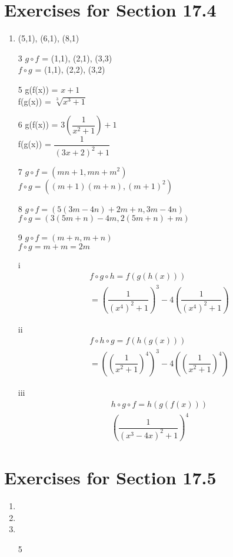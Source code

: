 \documentclass[12pt]{article}
\begin{document}
\section*{Exercises for Section 17.4}
\begin{enumerate}
    \item {(5,1), (6,1), (8,1)}
    \item [3] $g\circ f$ = {(1,1), (2,1), (3,3)}\\
    $f\circ g$ = {(1,1), (2,2), (3,2)}\\
	\item [5] g(f(x)) = $x+1$\\
	    f(g(x)) = $\sqrt[3]{x^3 + 1}$
	\item [6] g(f(x)) = $3(\dfrac{1}{x^2 + 1})+1$\\
	    f(g(x)) = $\dfrac{1}{(3x+2)^2 + 1}$
	\item [7] $g\circ f = (mn + 1,mn + m^2)$\\
    $f\circ g = ((m+1)(m+n), (m+1)^2)$\\
	\item [8] $g\circ f = (5(3m-4n)+2m+n,3m-4n)$\\
    $f\circ g = (3(5m+n)-4m,2(5m+n)+m)$\\
	\item [9] $g\circ f = (m+n,m+n)$\\
    $f\circ g = m+m = 2m$\\
\end{enumerate}
\begin{enumerate}
    \item [i]
	\begin{equation*}
		\begin{split}
			f\circ g \circ h = f(g(h(x)))\\
			= (\dfrac{1}{(x^4)^2 + 1})^3 -4(\dfrac{1}{(x^4)^2 + 1})
		\end{split}
	\end{equation*}
    \item [ii]
	\begin{equation*}
		\begin{split}
			f\circ h \circ g = f(h(g(x)))\\
			= ((\dfrac{1}{x^2 + 1})^4)^3 -4((\dfrac{1}{x^2 + 1})^4)
		\end{split}
	\end{equation*}
    \item [iii]
	\begin{equation*}
		\begin{split}
			h\circ g \circ f = h(g(f(x)))\\
			(\dfrac{1}{(x^3 -4x)^2 + 1})^4
		\end{split}
	\end{equation*}
\end{enumerate}
\section*{Exercises for Section 17.5}
\begin{enumerate}
	\item 
	\item 
	\item 
	\item [5]
\end{enumerate}
\end{document}
